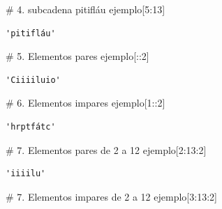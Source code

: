 \documentclass[
  spanish,
  letterpaper,
]{scrbook}
\newenvironment{Shaded}{\begin{snugshade}}{\end{snugshade}}
\newcommand{\CommentTok}[1]{\textcolor[rgb]{0.37,0.37,0.37}{#1}}
\newcommand{\DecValTok}[1]{\textcolor[rgb]{0.68,0.00,0.00}{#1}}
\newcommand{\NormalTok}[1]{\textcolor[rgb]{0.00,0.23,0.31}{#1}}
\theoremstyle{definition}
\theoremstyle{remark}
\begin{document}
\begin{Shaded}
\begin{Highlighting}[]
\CommentTok{\# 4. subcadena \textquotesingle{}pitifláu\textquotesingle{}}
\NormalTok{ejemplo[}\DecValTok{5}\NormalTok{:}\DecValTok{13}\NormalTok{]}
\end{Highlighting}
\end{Shaded}

\begin{verbatim}
'pitifláu'
\end{verbatim}

\begin{Shaded}
\begin{Highlighting}[]
\CommentTok{\# 5. Elementos pares}
\NormalTok{ejemplo[::}\DecValTok{2}\NormalTok{]}
\end{Highlighting}
\end{Shaded}

\begin{verbatim}
'Ciiiiluio'
\end{verbatim}

\begin{Shaded}
\begin{Highlighting}[]
\CommentTok{\# 6. Elementos impares}
\NormalTok{ejemplo[}\DecValTok{1}\NormalTok{::}\DecValTok{2}\NormalTok{]}
\end{Highlighting}
\end{Shaded}

\begin{verbatim}
'hrptfátc'
\end{verbatim}

\begin{Shaded}
\begin{Highlighting}[]
\CommentTok{\# 7. Elementos pares de 2 a 12}
\NormalTok{ejemplo[}\DecValTok{2}\NormalTok{:}\DecValTok{13}\NormalTok{:}\DecValTok{2}\NormalTok{]}
\end{Highlighting}
\end{Shaded}

\begin{verbatim}
'iiiilu'
\end{verbatim}

\begin{Shaded}
\begin{Highlighting}[]
\CommentTok{\# 7. Elementos impares de 2 a 12}
\NormalTok{ejemplo[}\DecValTok{3}\NormalTok{:}\DecValTok{13}\NormalTok{:}\DecValTok{2}\NormalTok{]}
\end{Highlighting}
\end{Shaded}
\end{document}
